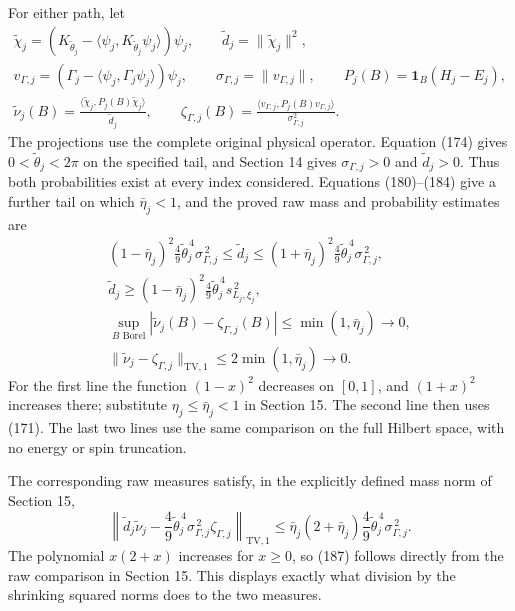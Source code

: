 \documentclass[
  11pt,
]{article}
\begin{document}
For either path, let \[
 \begin{gathered}
 \widetilde\chi_j=(K_{\widetilde\theta_j}
     -\langle\psi_j,K_{\widetilde\theta_j}\psi_j\rangle)\psi_j,
 \qquad \widetilde d_j=\|\widetilde\chi_j\|^2,\\
 v_{\Gamma,j}=(\Gamma_j-\langle\psi_j,\Gamma_j\psi_j\rangle)\psi_j,
 \qquad \sigma_{\Gamma,j}=\|v_{\Gamma,j}\|,\qquad
 P_j(B)=\mathbf1_B(H_j-E_j),\\
 \widetilde\nu_j(B)=
   \frac{\langle\widetilde\chi_j,P_j(B)\widetilde\chi_j\rangle}
        {\widetilde d_j},\qquad
 \zeta_{\Gamma,j}(B)=
   \frac{\langle v_{\Gamma,j},P_j(B)v_{\Gamma,j}\rangle}
        {\sigma_{\Gamma,j}^2}.
 \end{gathered}
 \tag{185}
\] The projections use the complete original physical operator. Equation
(174) gives \(0<\widetilde\theta_j<2\pi\) on the specified tail, and
Section 14 gives \(\sigma_{\Gamma,j}>0\) and \(\widetilde d_j>0\). Thus
both probabilities exist at every index considered. Equations
(180)--(184) give a further tail on which \(\bar\eta_j<1\), and the
proved raw mass and probability estimates are \[
 \begin{gathered}
 (1-\bar\eta_j)^2\frac49\widetilde\theta_j^{\,4}
       \sigma_{\Gamma,j}^{\,2}
 \le\widetilde d_j\le
 (1+\bar\eta_j)^2\frac49\widetilde\theta_j^{\,4}
       \sigma_{\Gamma,j}^{\,2},\\
 \widetilde d_j\ge
 (1-\bar\eta_j)^2\frac49\widetilde\theta_j^{\,4}s_{L_j,\xi_j}^{\,2},\\
 \sup_{B\text{ Borel}}|\widetilde\nu_j(B)-\zeta_{\Gamma,j}(B)|
       \le\min(1,\bar\eta_j)\longrightarrow0,\\
 \|\widetilde\nu_j-\zeta_{\Gamma,j}\|_{\mathrm{TV},1}
       \le2\min(1,\bar\eta_j)\longrightarrow0.
 \end{gathered}
 \tag{186}
\] For the first line the function \((1-x)^2\) decreases on \([0,1]\),
and \((1+x)^2\) increases there; substitute \(\eta_j\le\bar\eta_j<1\) in
Section 15. The second line then uses (171). The last two lines use the
same comparison on the full Hilbert space, with no energy or spin
truncation.

The corresponding raw measures satisfy, in the explicitly defined mass
norm of Section 15, \[
 \left\|\widetilde d_j\widetilde\nu_j
 -\frac49\widetilde\theta_j^{\,4}\sigma_{\Gamma,j}^{\,2}
                 \zeta_{\Gamma,j}\right\|_{\mathrm{TV},1}
 \le\bar\eta_j(2+\bar\eta_j)
       \frac49\widetilde\theta_j^{\,4}\sigma_{\Gamma,j}^{\,2}.
 \tag{187}
\] The polynomial \(x(2+x)\) increases for \(x\ge0\), so (187) follows
directly from the raw comparison in Section 15. This displays exactly
what division by the shrinking squared norms does to the two measures.
\end{document}
